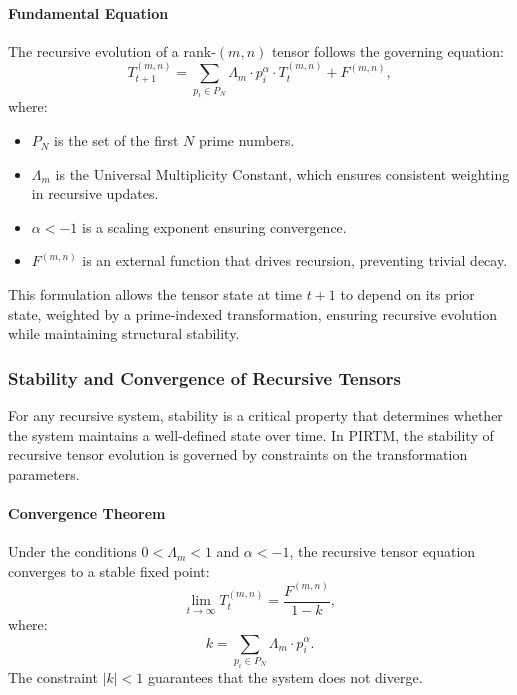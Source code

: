 \documentclass[12pt]{article}
\begin{document}
\paragraph{Fundamental Equation}
The recursive evolution of a rank-\((m,n)\) tensor follows the governing equation:
\begin{equation}
    T_{t+1}^{(m,n)} = \sum_{p_i \in P_N} \Lambda_m \cdot p_i^\alpha \cdot T_t^{(m,n)} + F^{(m,n)},
\end{equation}
where:
\begin{itemize}
    \item \( P_N \) is the set of the first \( N \) prime numbers.
    \item \( \Lambda_m \) is the Universal Multiplicity Constant, which ensures consistent weighting in recursive updates.
    \item \( \alpha < -1 \) is a scaling exponent ensuring convergence.
    \item \( F^{(m,n)} \) is an external function that drives recursion, preventing trivial decay.
\end{itemize}

This formulation allows the tensor state at time \( t+1 \) to depend on its prior state, weighted by a prime-indexed transformation, ensuring recursive evolution while maintaining structural stability.

\subsubsection{Stability and Convergence of Recursive Tensors}

For any recursive system, stability is a critical property that determines whether the system maintains a well-defined state over time. In PIRTM, the stability of recursive tensor evolution is governed by constraints on the transformation parameters.

\paragraph{Convergence Theorem}
Under the conditions \( 0 < \Lambda_m < 1 \) and \( \alpha < -1 \), the recursive tensor equation converges to a stable fixed point:
\begin{equation}
    \lim_{t \to \infty} T_t^{(m,n)} = \frac{F^{(m,n)}}{1 - k},
\end{equation}
where:
\begin{equation}
    k = \sum_{p_i \in P_N} \Lambda_m \cdot p_i^\alpha.
\end{equation}
The constraint \( |k| < 1 \) guarantees that the system does not diverge.
\end{document}
